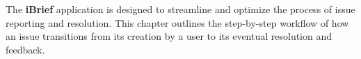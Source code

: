 The \textbf{iBrief} application is designed to streamline and optimize the process of issue reporting and resolution. This chapter outlines the step-by-step \gls{workflow} of how an issue transitions from its creation by a user to its eventual resolution and feedback.
